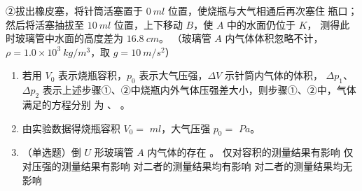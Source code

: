 \begin{enumerate}
②拔出橡皮塞，将针筒活塞置于 $ 0 \ m l $ 位置，使烧瓶与大气相通后再次塞住
瓶口；然后将活塞抽拔至 $ 10 \ m l $ 位置，上下移动 $ B $，使 $ A $ 中的水面仍位于 $ K $，
测得此时玻璃管中水面的高度差为 $ 16.8 \ cm $。
（玻璃管 $ A $ 内气体体积忽略不计，
$ \rho =1.0 \times 10^{3} \ kg/m^{3} $，取 $ g=10 \ m/s^{2} $）
\begin{figure}[h!]
	\centering
	
\end{figure}

\begin{enumerate}
	\item
若用 $ V_{0} $ 表示烧瓶容积，$ p_{0} $ 表示大气压强，$ \Delta V $ 示针筒内气体的体积，
$ \Delta p_{1} $、$ \Delta p_{2} $ 表示上述步骤①、②中烧瓶内外气体压强差大小，则步骤①、②中，气体满足的方程分别
为 \underlinegap 、 \underlinegap 。

\item 
由实验数据得烧瓶容积 $ V_{0}=$ \underlinegap $ml $，大气压强 $ p_{0} =$ \underlinegap $Pa $。

\item 
（单选题）倒 $ U $ 形玻璃管 $ A $ 内气体的存在 \underlinegap 。
\fourchoices
{仅对容积的测量结果有影响}
{仅对压强的测量结果有影响}
{对二者的测量结果均有影响}
{对二者的测量结果均无影响}



	

\end{enumerate}




\end{enumerate}

